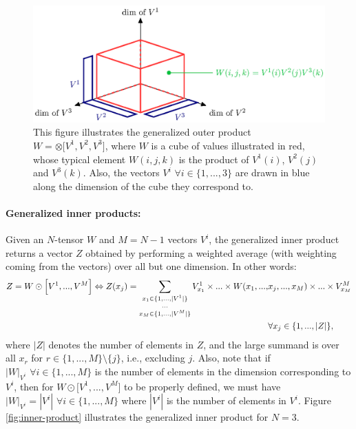 \documentclass[twoside,11pt]{article}
\begin{document}
\begin{figure}[H]
	\begin{center}
	\includegraphics[scale=0.9]{BTAI-figure7}
	\end{center}
  \caption{This figure illustrates the generalized outer product $W = \otimes \big[ V^1, V^2, V^3 \big]$, where $W$ is a cube of values illustrated in red, whose typical element $W(i,j,k)$ is the product of $V^1(i)$, $V^2(j)$ and $V^3(k)$. Also, the vectors $V^i \,\, \forall i \in \{1, ..., 3\}$ are drawn in blue along the dimension of the cube they correspond to.}
   \label{fig:outer-product}
\end{figure}

\paragraph{Generalized inner products:}

Given an $N$-tensor $W$ and $M = N - 1$ vectors $V^i$, the generalized inner product returns a vector $Z$ obtained by performing a weighted average (with weighting coming from the vectors) over all but one dimension. In other words:
\begin{align}
Z = W \odot \Big[ V^1, ..., V^{M}\Big] \Leftrightarrow Z(x_j) = \sum_{\substack{x_1 \in \{1, ..., |V^1|\}\\
{\color{white}\}}...{\color{white}\}}\nonumber\\
x_M \in \{1, ..., |V^M|\} }} V^1_{x_1} \times ... \times W(x_1, ..., & x_j, ..., x_{M}) \times ... \times V^{M}_{x_{M}}\\
& \forall x_j \in \{1, ..., |Z|\},
\end{align}
where $|Z|$ denotes the number of elements in $Z$, and the large summand is over all $x_r$ for $r \in \{1, ..., M\} \setminus \{j\}$, i.e., excluding $j$. Also, note that if $|W|_{V^i} \,\, \forall i \in \{1, ..., M\}$ is the number of elements in the dimension corresponding to $V^i$, then for $W \odot \big[ V^1, ..., V^{M}\big]$ to be properly defined, we must have $|W|_{V^i} = |V^i| \,\, \forall i \in \{1, ..., M\}$ where $|V^i|$ is the number of elements in $V^i$. Figure \ref{fig:inner-product} illustrates the generalized inner product for $N = 3$.
\end{document}
